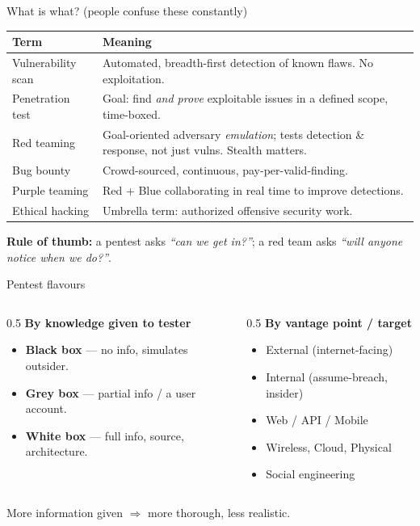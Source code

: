 \documentclass[aspectratio=169,11pt]{beamer}
\begin{document}
\begin{frame}{What is what? (people confuse these constantly)}
  \begin{table}
  \footnotesize
  \begin{tabular}{@{}p{3.1cm}p{8.3cm}@{}}
  \toprule
  \textbf{Term} & \textbf{Meaning} \\
  \midrule
  Vulnerability scan & Automated, breadth-first detection of known flaws. No exploitation. \\
  Penetration test   & Goal: find \emph{and prove} exploitable issues in a defined scope, time-boxed. \\
  Red teaming        & Goal-oriented adversary \emph{emulation}; tests detection \& response, not just vulns. Stealth matters. \\
  Bug bounty         & Crowd-sourced, continuous, pay-per-valid-finding. \\
  Purple teaming     & Red + Blue collaborating in real time to improve detections. \\
  Ethical hacking    & Umbrella term: authorized offensive security work. \\
  \bottomrule
  \end{tabular}
  \end{table}
  \vspace{0.3em}
  \footnotesize\textbf{Rule of thumb:} a pentest asks \emph{``can we get in?''};
  a red team asks \emph{``will anyone notice when we do?''}.
\end{frame}

\begin{frame}{Pentest flavours}
  \begin{columns}[T]
    \begin{column}{0.5\textwidth}
      \textbf{By knowledge given to tester}
      \begin{itemize}
        \item \textbf{Black box} --- no info, simulates outsider.
        \item \textbf{Grey box} --- partial info / a user account.
        \item \textbf{White box} --- full info, source, architecture.
      \end{itemize}
    \end{column}
    \begin{column}{0.5\textwidth}
      \textbf{By vantage point / target}
      \begin{itemize}
        \item External (internet-facing)
        \item Internal (assume-breach, insider)
        \item Web / API / Mobile
        \item Wireless, Cloud, Physical
        \item Social engineering
      \end{itemize}
    \end{column}
  \end{columns}
  \vspace{0.6em}
  More information given $\Rightarrow$ more thorough, less realistic.
\end{frame}
\end{document}
